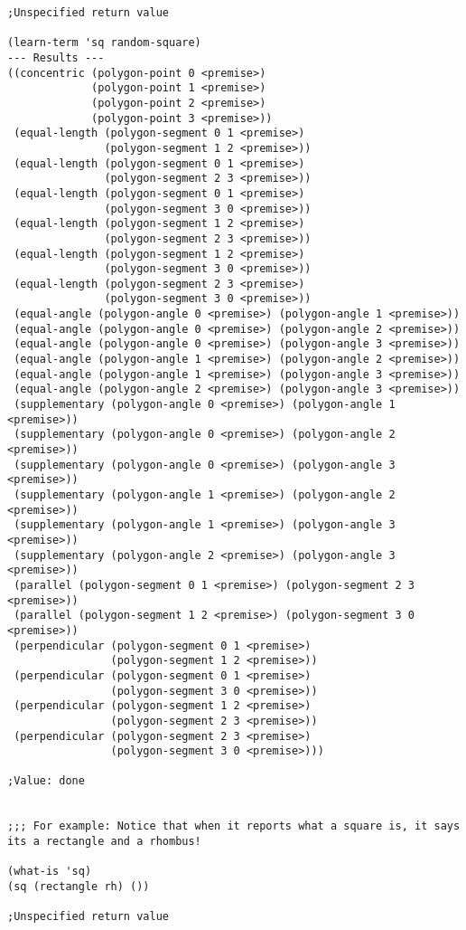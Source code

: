 \begin{verbatim}
;Unspecified return value

(learn-term 'sq random-square)
--- Results ---
((concentric (polygon-point 0 <premise>)
             (polygon-point 1 <premise>)
             (polygon-point 2 <premise>)
             (polygon-point 3 <premise>))
 (equal-length (polygon-segment 0 1 <premise>)
               (polygon-segment 1 2 <premise>))
 (equal-length (polygon-segment 0 1 <premise>)
               (polygon-segment 2 3 <premise>))
 (equal-length (polygon-segment 0 1 <premise>)
               (polygon-segment 3 0 <premise>))
 (equal-length (polygon-segment 1 2 <premise>)
               (polygon-segment 2 3 <premise>))
 (equal-length (polygon-segment 1 2 <premise>)
               (polygon-segment 3 0 <premise>))
 (equal-length (polygon-segment 2 3 <premise>)
               (polygon-segment 3 0 <premise>))
 (equal-angle (polygon-angle 0 <premise>) (polygon-angle 1 <premise>))
 (equal-angle (polygon-angle 0 <premise>) (polygon-angle 2 <premise>))
 (equal-angle (polygon-angle 0 <premise>) (polygon-angle 3 <premise>))
 (equal-angle (polygon-angle 1 <premise>) (polygon-angle 2 <premise>))
 (equal-angle (polygon-angle 1 <premise>) (polygon-angle 3 <premise>))
 (equal-angle (polygon-angle 2 <premise>) (polygon-angle 3 <premise>))
 (supplementary (polygon-angle 0 <premise>) (polygon-angle 1 <premise>))
 (supplementary (polygon-angle 0 <premise>) (polygon-angle 2 <premise>))
 (supplementary (polygon-angle 0 <premise>) (polygon-angle 3 <premise>))
 (supplementary (polygon-angle 1 <premise>) (polygon-angle 2 <premise>))
 (supplementary (polygon-angle 1 <premise>) (polygon-angle 3 <premise>))
 (supplementary (polygon-angle 2 <premise>) (polygon-angle 3 <premise>))
 (parallel (polygon-segment 0 1 <premise>) (polygon-segment 2 3 <premise>))
 (parallel (polygon-segment 1 2 <premise>) (polygon-segment 3 0 <premise>))
 (perpendicular (polygon-segment 0 1 <premise>)
                (polygon-segment 1 2 <premise>))
 (perpendicular (polygon-segment 0 1 <premise>)
                (polygon-segment 3 0 <premise>))
 (perpendicular (polygon-segment 1 2 <premise>)
                (polygon-segment 2 3 <premise>))
 (perpendicular (polygon-segment 2 3 <premise>)
                (polygon-segment 3 0 <premise>)))

;Value: done


;;; For example: Notice that when it reports what a square is, it says
its a rectangle and a rhombus!

(what-is 'sq)
(sq (rectangle rh) ())

;Unspecified return value
\end{verbatim}
